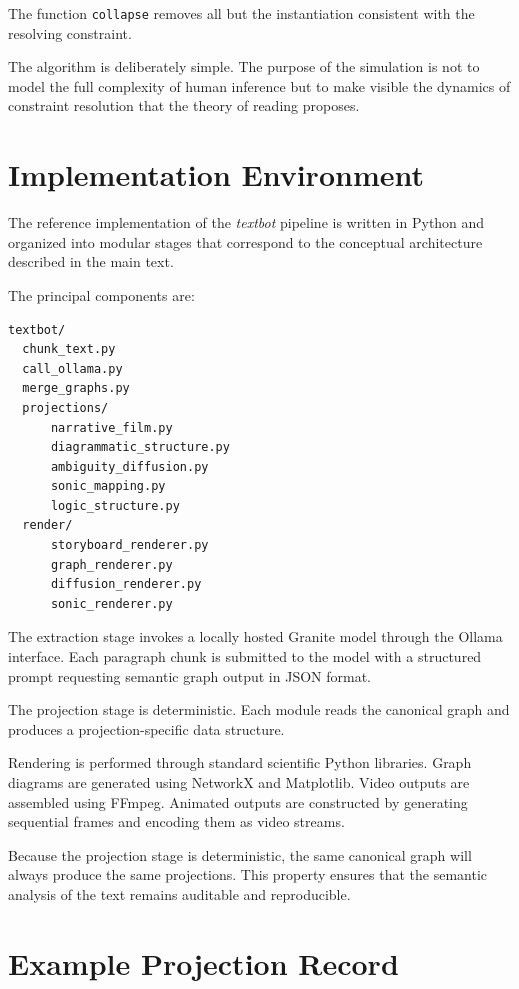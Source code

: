 \documentclass[12pt, a4paper]{article}
\begin{document}
The function \texttt{collapse} removes all but the instantiation consistent with the resolving constraint.

The algorithm is deliberately simple. The purpose of the simulation is not to model the full complexity of human inference but to make visible the dynamics of constraint resolution that the theory of reading proposes.

\section{Implementation Environment}

The reference implementation of the \textit{textbot} pipeline is written in Python and organized into modular stages that correspond to the conceptual architecture described in the main text.

The principal components are:

\begin{verbatim}
textbot/
  chunk_text.py
  call_ollama.py
  merge_graphs.py
  projections/
      narrative_film.py
      diagrammatic_structure.py
      ambiguity_diffusion.py
      sonic_mapping.py
      logic_structure.py
  render/
      storyboard_renderer.py
      graph_renderer.py
      diffusion_renderer.py
      sonic_renderer.py
\end{verbatim}

The extraction stage invokes a locally hosted Granite model through the Ollama interface. Each paragraph chunk is submitted to the model with a structured prompt requesting semantic graph output in JSON format.

The projection stage is deterministic. Each module reads the canonical graph and produces a projection-specific data structure.

Rendering is performed through standard scientific Python libraries. Graph diagrams are generated using NetworkX and Matplotlib. Video outputs are assembled using FFmpeg. Animated outputs are constructed by generating sequential frames and encoding them as video streams.

Because the projection stage is deterministic, the same canonical graph will always produce the same projections. This property ensures that the semantic analysis of the text remains auditable and reproducible.

\section{Example Projection Record}
\end{document}
